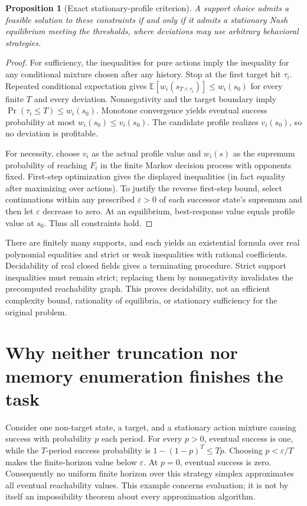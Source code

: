 \documentclass[11pt]{article}
\newtheorem{proposition}{Proposition}
\newcommand{\E}{\mathbb E}
\begin{document}
\begin{proposition}[Exact stationary-profile criterion]
A support choice admits a feasible solution to these constraints if and only if it admits a stationary Nash equilibrium meeting the thresholds, where deviations may use arbitrary behavioral strategies.
\end{proposition}
\begin{proof}
For sufficiency, the inequalities for pure actions imply the inequality for any conditional mixture chosen after any history. Stop at the first target hit $\tau_i$. Repeated conditional expectation gives
$\E[w_i(s_{T\wedge\tau_i})]\leq w_i(s_0)$ for every finite $T$ and every deviation. Nonnegativity and the target boundary imply $\Pr(\tau_i\leq T)\leq w_i(s_0)$. Monotone convergence yields eventual success probability at most $w_i(s_0)\leq v_i(s_0)$. The candidate profile realizes $v_i(s_0)$, so no deviation is profitable.

For necessity, choose $v_i$ as the actual profile value and $w_i(s)$ as the supremum probability of reaching $F_i$ in the finite Markov decision process with opponents fixed. First-step optimization gives the displayed inequalities (in fact equality after maximizing over actions). To justify the reverse first-step bound, select continuations within any prescribed $\varepsilon>0$ of each successor state's supremum and then let $\varepsilon$ decrease to zero. At an equilibrium, best-response value equals profile value at $s_0$. Thus all constraints hold.
\end{proof}

There are finitely many supports, and each yields an existential formula over real polynomial equalities and strict or weak inequalities with rational coefficients. Decidability of real closed fields gives a terminating procedure. Strict support inequalities must remain strict; replacing them by nonnegativity invalidates the precomputed reachability graph. This proves decidability, not an efficient complexity bound, rationality of equilibria, or stationary sufficiency for the original problem.

\section*{Why neither truncation nor memory enumeration finishes the task}
Consider one non-target state, a target, and a stationary action mixture causing success with probability $p$ each period. For every $p>0$, eventual success is one, while the $T$-period success probability is $1-(1-p)^T\leq Tp$. Choosing $p<\varepsilon/T$ makes the finite-horizon value below $\varepsilon$. At $p=0$, eventual success is zero. Consequently no uniform finite horizon over this strategy simplex approximates all eventual reachability values. This example concerns evaluation; it is not by itself an impossibility theorem about every approximation algorithm.
\end{document}
